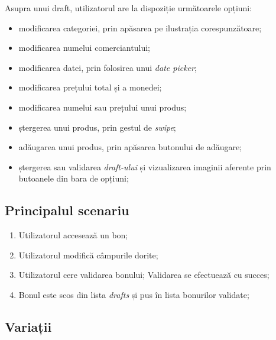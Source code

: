 Asupra unui draft, utilizatorul are la dispoziție următoarele opțiuni:
\begin{multicols}{2}
\begin{itemize}
  \item
    modificarea categoriei, prin apăsarea pe ilustrația corespunzătoare;
  \item
    modificarea numelui comerciantului;
  \item
    modificarea datei, prin folosirea unui \emph{date picker};
  \item
    modificarea prețului total și a monedei;
  \item
    modificarea numelui sau prețului unui produs;
  \item
    ștergerea unui produs, prin gestul de \emph{swipe};
  \item
    adăugarea unui produs, prin apăsarea butonului de adăugare;
  \item
    ștergerea sau validarea \emph{draft-ului} și vizualizarea imaginii aferente prin butoanele din bara de opțiuni;
\end{itemize}
\end{multicols}

\subsection*{Principalul scenariu}



\begin{enumerate}
\item
  Utilizatorul accesează un bon;
\item
  Utilizatorul modifică câmpurile dorite;
\item
  Utilizatorul cere validarea bonului; Validarea se efectuează cu succes;
\item
  Bonul este scos din lista \emph{drafts} și pus în lista bonurilor validate;
\end{enumerate}


\subsection*{Variații}

